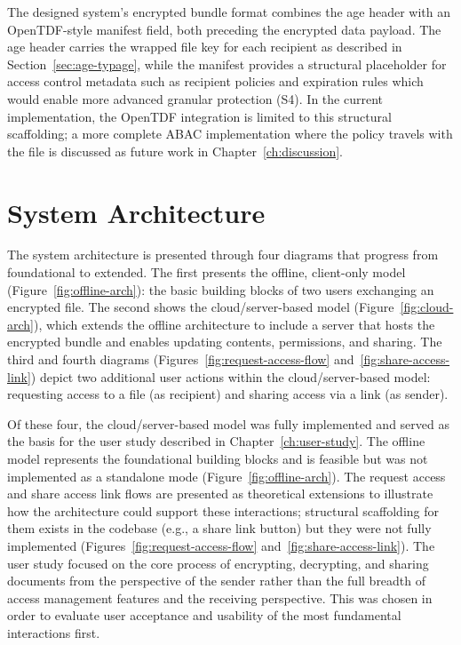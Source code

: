 The designed system's encrypted bundle format combines the age header with an OpenTDF-style manifest field, both preceding the encrypted data payload. The age header carries the wrapped file key for each recipient as described in Section~\ref{sec:age-typage}, while the manifest provides a structural placeholder for access control metadata such as recipient policies and expiration rules which would enable more advanced granular protection (S4). In the current implementation, the OpenTDF integration is limited to this structural scaffolding; a more complete ABAC implementation where the policy travels with the file is discussed as future work in Chapter~\ref{ch:discussion}.

\section{System Architecture}
\label{sec:architecture}

The system architecture is presented through four diagrams that progress from foundational to extended. The first presents the offline, client-only model (Figure~\ref{fig:offline-arch}): the basic building blocks of two users exchanging an encrypted file. The second shows the cloud/server-based model (Figure~\ref{fig:cloud-arch}), which extends the offline architecture to include a server that hosts the encrypted bundle and enables updating contents, permissions, and sharing. The third and fourth diagrams (Figures~\ref{fig:request-access-flow} and~\ref{fig:share-access-link}) depict two additional user actions within the cloud/server-based model: requesting access to a file (as recipient) and sharing access via a link (as sender).

Of these four, the cloud/server-based model was fully implemented and served as the basis for the user study described in Chapter~\ref{ch:user-study}. The offline model represents the foundational building blocks and is feasible but was not implemented as a standalone mode (Figure~\ref{fig:offline-arch}). The request access and share access link flows are presented as theoretical extensions to illustrate how the architecture could support these interactions; structural scaffolding for them exists in the codebase (e.g., a share link button) but they were not fully implemented (Figures~\ref{fig:request-access-flow} and~\ref{fig:share-access-link}). The user study focused on the core process of encrypting, decrypting, and sharing documents from the perspective of the sender rather than the full breadth of access management features and the receiving perspective. This was chosen in order to evaluate user acceptance and usability of the most fundamental interactions first.

